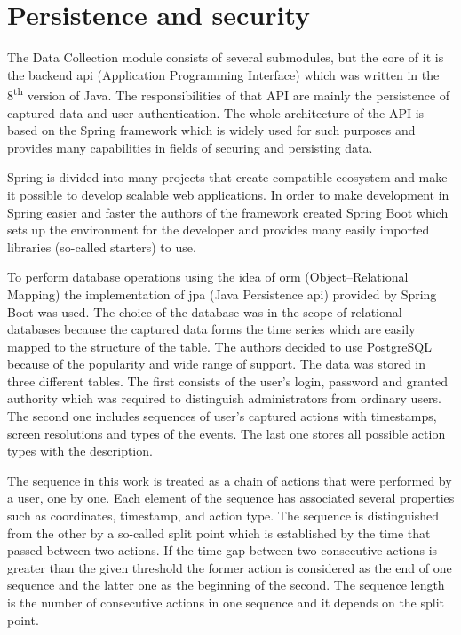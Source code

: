 \section{Persistence and security}\label{sec:persistence-and-security}
The Data Collection module consists of several submodules, but the core of it is the backend \gls{api} (Application Programming Interface) which was written in the 8\textsuperscript{th} version of Java.
The responsibilities of that API are mainly the persistence of captured data and user authentication.
The whole architecture of the API is based on the Spring framework which is widely used for such purposes and provides many capabilities in fields of securing and persisting data.

Spring is divided into many projects that create compatible ecosystem and make it possible to develop scalable web applications.
In order to make development in Spring easier and faster the authors of the framework created Spring Boot which sets up the environment for the developer and provides many easily imported libraries (so-called starters) to use.

To perform database operations using the idea of \gls{orm} (Object–Relational Mapping) the implementation of \gls{jpa} (Java Persistence \gls{api}) provided by Spring Boot was used.
The choice of the database was in the scope of relational databases because the captured data forms the time series which are easily mapped to the structure of the table.
The authors decided to use PostgreSQL because of the popularity and wide range of support.
The data was stored in three different tables.
The first consists of the user's login, password and granted authority which was required to distinguish administrators from ordinary users.
The second one includes sequences of user's captured actions with timestamps, screen resolutions and types of the events.
The last one stores all possible action types with the description.

The sequence in this work is treated as a chain of actions that were performed by a user, one by one.
Each element of the sequence has associated several properties such as coordinates, timestamp, and action type.
The sequence is distinguished from the other by a so-called split point which is established by the time that passed between two actions.
If the time gap between two consecutive actions is greater than the given threshold the former action is considered as the end of one sequence and the latter one as the beginning of the second.
The sequence length is the number of consecutive actions in one sequence and it depends on the split point.

